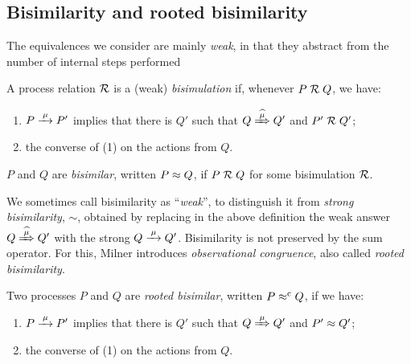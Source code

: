 \subsection{Bisimilarity and  rooted bisimilarity}
\label{ss:BiEx}

The equivalences we consider are  mainly
 \emph{weak}, in that they
abstract from the number of internal steps performed
\begin{definition}[bisimilarity]
\label{d:wb}
A process relation ${{\cal R}}$ 
 is a (weak) \emph{bisimulation} if, whenever
 $P\mathrel{\cal R} Q$, %
we have:
\begin{enumerate}
\item 
    $P \arr\mu P'$   implies that there is $Q'$ such that $Q \Arcap \mu Q'$ and $P' \mathrel{\cal R} Q'$;
\item the converse of (1)
 on the actions from $Q$.
\end{enumerate}  
 $P$ and $Q$ are \emph{bisimilar},
written $P \approx
 Q$, if $P \mathrel{\cal R} Q$ for some  bisimulation ${\cal R}$.  
\end{definition} 

We sometimes call bisimilarity as ``\emph{weak}'', to
distinguish it from \emph{strong bisimilarity}, $\sim$,
obtained by replacing in the above definition   the weak answer $
Q\Arcap\mu Q'$ with the strong  $Q \arr \mu Q'$.
Bisimilarity is not preserved by the sum operator. 
For this, Milner introduces \emph{observational congruence}, also called \emph{rooted
  bisimilarity}.
\begin{definition}
\label{d:rootedBisimilarity}
Two processes $P$ and $Q$ are \emph{rooted bisimilar}, written $P
\mathrel{\approx^{\rm{c}}} Q$, if we have:
\begin{enumerate}
 \item  $P \arr\mu P'$ implies that there is $Q'$ such that $Q
   \Arr\mu Q'$ and $P' \approx Q'$;
\item the converse of (1) on the actions from $Q$.
\end{enumerate}
\end{definition}


